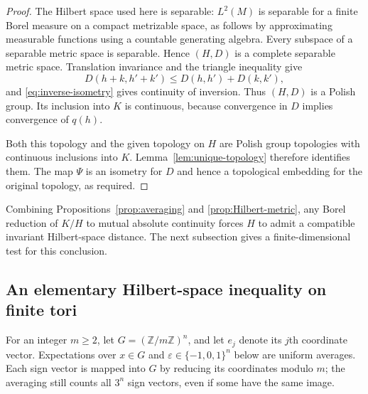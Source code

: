 \documentclass[11pt]{article}
\numberwithin{equation}{section}
\theoremstyle{definition}
\newcommand{\Z}{\mathbb Z}
\begin{document}
\begin{proof}
The Hilbert space used here is separable: $L^2(M)$ is separable for a
finite Borel measure on a compact metrizable space, as follows by
approximating measurable functions using a countable generating algebra.
Every subspace of a separable metric space is separable. Hence $(H,D)$
is a complete separable metric space. Translation invariance and the
triangle inequality give
\[
 D(h+k,h'+k')\le D(h,h')+D(k,k'),
\]
and \eqref{eq:inverse-isometry} gives continuity of inversion. Thus
$(H,D)$ is a Polish group. Its inclusion into $K$ is continuous, because
convergence in $D$ implies convergence of $q(h)$.

Both this topology and the given topology on $H$ are Polish group
topologies with continuous inclusions into $K$. Lemma~\ref{lem:unique-topology}
therefore identifies them. The map $\Psi$ is an isometry for $D$ and
hence a topological embedding for the original topology, as required.
\end{proof}

Combining Propositions~\ref{prop:averaging} and
\ref{prop:Hilbert-metric}, any Borel reduction of $K/H$ to mutual absolute
continuity forces $H$ to admit a compatible invariant Hilbert-space
distance. The next subsection gives a finite-dimensional test for this
conclusion.
\subsection{An elementary Hilbert-space inequality on finite tori}
For an integer $m\ge2$, let $G=(\Z/m\Z)^n$, and let $e_j$ denote its
$j$th coordinate vector. Expectations over $x\in G$ and
$\varepsilon\in\{-1,0,1\}^n$ below are uniform averages. Each sign
vector is mapped into $G$ by reducing its coordinates modulo $m$;
the averaging still counts all $3^n$ sign vectors, even if some have
the same image.
\end{document}

